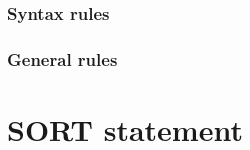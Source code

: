 \begin{syntax}
      
\end{syntax}

\subsubsection{Syntax rules}

\subsubsection{General rules}

\section{SORT statement}

